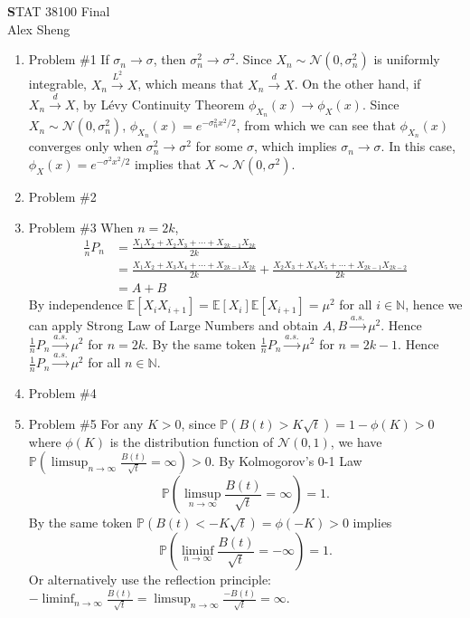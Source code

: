 \documentclass[11pt]{article}
\theoremstyle{definition}
\newcommand{\0}{\mathbf{0}}
\newcommand{\E}{\mathbb{E}}
\begin{document}
\begin{center}
{\Large\textbf STAT 38100 \hspace{0.1cm} Final}\\
\Large{Alex Sheng}
\end{center}

\vspace{0.2 cm}

\begin{enumerate}

\item Problem \#1\smallbreak
If $\sigma_n\to\sigma$, then $\sigma_n^2\to\sigma^2$. Since $X_n\sim\mathcal{N}(0,\sigma_n^2)$ is uniformly integrable, $X_n\xrightarrow{L^2}X$, which means that $X_n\xrightarrow{d}X$.\smallbreak
On the other hand, if $X_n\xrightarrow{d}X$, by Lévy Continuity Theorem $\phi_{X_n}(x)\to\phi_X(x)$. Since $X_n\sim\mathcal{N}(0,\sigma_n^2)$, $\phi_{X_n}(x)=e^{-\sigma_n^2x^2/2}$, from which we can see that $\phi_{X_n}(x)$ converges only when $\sigma_n^2\to\sigma^2$ for some $\sigma$, which implies $\sigma_n\to\sigma$. In this case, $\phi_X(x)=e^{-\sigma^2x^2/2}$ implies that $X\sim\mathcal{N}(0,\sigma^2)$.

\item Problem \#2\smallbreak



\item Problem \#3\smallbreak
When $n=2k$,
\begin{align*}
\frac{1}{n}P_n&=\frac{X_1X_2+X_2X_3+\cdots+X_{2k-1}X_{2k}}{2k}\\
&=\frac{X_1X_2+X_3X_4+\cdots+X_{2k-1}X_{2k}}{2k}+\frac{X_2X_3+X_4X_5+\cdots+X_{2k-1}X_{2k-2}}{2k}\\
&=A+B
\end{align*}
By independence $\E[X_iX_{i+1}]=\E[X_i]\E[X_{i+1}]=\mu^2$ for all $i\in\mathbb{N}$, hence we can apply Strong Law of Large Numbers and obtain $A,B\xrightarrow{a.s.}\mu^2$. Hence $\frac{1}{n}P_n\xrightarrow{a.s.}\mu^2$ for $n=2k$.\smallbreak
By the same token $\frac{1}{n}P_n\xrightarrow{a.s.}\mu^2$ for $n=2k-1$. Hence $\frac{1}{n}P_n\xrightarrow{a.s.}\mu^2$ for all $n\in\mathbb{N}$.

\item Problem \#4\smallbreak

\item Problem \#5\smallbreak
For any $K>0$, since $\mathbb{P}(B(t)>K\sqrt{t})=1-\phi(K)>0$ where $\phi(K)$ is the distribution function of $\mathcal{N}(0,1)$, we have $\mathbb{P}(\limsup_{n\to\infty}\frac{B(t)}{\sqrt{t}}=\infty)>0$. By Kolmogorov's 0-1 Law 
\[\mathbb{P}(\limsup_{n\to\infty}\frac{B(t)}{\sqrt{t}}=\infty)=1.\]
By the same token $\mathbb{P}(B(t)<-K\sqrt{t})=\phi(-K)>0$ implies
\[\mathbb{P}(\liminf_{n\to\infty}\frac{B(t)}{\sqrt{t}}=-\infty)=1.\]
Or alternatively use the reflection principle: $-\liminf_{n\to\infty}\frac{B(t)}{\sqrt{t}}=\limsup_{n\to\infty}\frac{-B(t)}{\sqrt{t}}=\infty$.


\end{enumerate}
\end{document}
